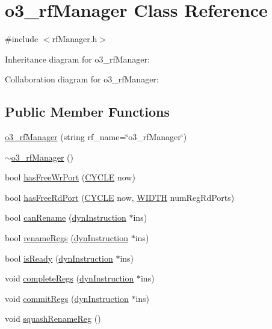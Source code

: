 \hypertarget{classo3__rfManager}{
\section{o3\_\-rfManager Class Reference}
\label{classo3__rfManager}
}


{\ttfamily \#include $<$rfManager.h$>$}



Inheritance diagram for o3\_\-rfManager:


Collaboration diagram for o3\_\-rfManager:
\subsection*{Public Member Functions}
\begin{DoxyCompactItemize}
\item 
\hyperlink{classo3__rfManager_a0abe0df5acbb3b9d1514b62d38647cff}{o3\_\-rfManager} (string rf\_\-name=\char`\"{}o3\_\-rfManager\char`\"{})
\item 
\hyperlink{classo3__rfManager_a42a66fc34794ca6c7209f743557a2b3a}{$\sim$o3\_\-rfManager} ()
\item 
bool \hyperlink{classo3__rfManager_a95bfea851bf8107f208e550839749063}{hasFreeWrPort} (\hyperlink{global_2global_8h_a7e19a550ec11d1ed921deb20c22efb5b}{CYCLE} now)
\item 
bool \hyperlink{classo3__rfManager_a0883b605da49fe18bf7a1a04219307ab}{hasFreeRdPort} (\hyperlink{global_2global_8h_a7e19a550ec11d1ed921deb20c22efb5b}{CYCLE} now, \hyperlink{global_2global_8h_a6fa2e24b8a418fa215e183264cbea3aa}{WIDTH} numRegRdPorts)
\item 
bool \hyperlink{classo3__rfManager_a023f3671f90123fe8749ff13606f273c}{canRename} (\hyperlink{classdynInstruction}{dynInstruction} $\ast$ins)
\item 
bool \hyperlink{classo3__rfManager_a702dcade81b3d2ccba4bae0ef8d7de30}{renameRegs} (\hyperlink{classdynInstruction}{dynInstruction} $\ast$ins)
\item 
bool \hyperlink{classo3__rfManager_a9b85902c553b147228d0bb3b57280ca7}{isReady} (\hyperlink{classdynInstruction}{dynInstruction} $\ast$ins)
\item 
void \hyperlink{classo3__rfManager_a06b8854ab37feb6b44166a8565dc447a}{completeRegs} (\hyperlink{classdynInstruction}{dynInstruction} $\ast$ins)
\item 
void \hyperlink{classo3__rfManager_a7d3aa6c1316bac1153b24b7764d301fb}{commitRegs} (\hyperlink{classdynInstruction}{dynInstruction} $\ast$ins)
\item 
void \hyperlink{classo3__rfManager_ac8199decc9c7a881b2099a68711cced7}{squashRenameReg} ()
\end{DoxyCompactItemize}


